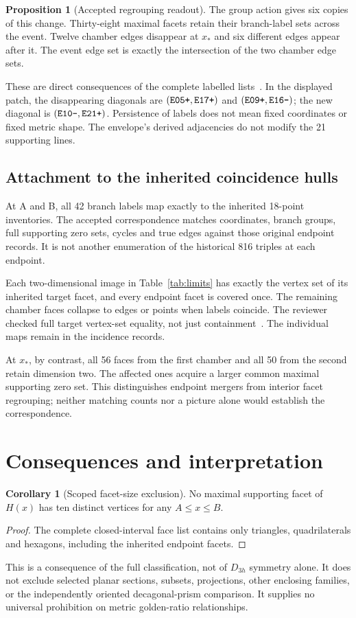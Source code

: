 \documentclass[11pt,a4paper]{article}
\newcommand{\xs}{x_*}
\newcommand{\br}[1]{\textnormal{\texttt{#1}}}
\theoremstyle{definition}
\newtheorem{proposition}[theorem]{Proposition}
\newtheorem{corollary}[theorem]{Corollary}
\begin{document}
\begin{proposition}[Accepted regrouping readout]\label{prop:regroup}
The group action gives six copies of this change. Thirty-eight maximal facets retain their branch-label sets across the event. Twelve chamber edges disappear at $\xs$ and six different edges appear after it. The event edge set is exactly the intersection of the two chamber edge sets.
\end{proposition}
These are direct consequences of the complete labelled lists~\cite{investigation,review}. In the displayed patch, the disappearing diagonals are $(\br{E05+},\br{E17+})$ and $(\br{E09+},\br{E16-})$; the new diagonal is $(\br{E10-},\br{E21+})$. Persistence of labels does not mean fixed coordinates or fixed metric shape. The envelope's derived adjacencies do not modify the 21 supporting lines.

\subsection{Attachment to the inherited coincidence hulls}\label{sec:endpoints}
At A and B, all 42 branch labels map exactly to the inherited 18-point inventories. The accepted correspondence matches coordinates, branch groups, full supporting zero sets, cycles and true edges against those original endpoint records. It is not another enumeration of the historical 816 triples at each endpoint.

Each two-dimensional image in Table~\ref{tab:limits} has exactly the vertex set of its inherited target facet, and every endpoint facet is covered once. The remaining chamber faces collapse to edges or points when labels coincide. The reviewer checked full target vertex-set equality, not just containment~\cite[Section 3.5]{review}. The individual maps remain in the incidence records.

At $\xs$, by contrast, all 56 faces from the first chamber and all 50 from the second retain dimension two. The affected ones acquire a larger common maximal supporting zero set. This distinguishes endpoint mergers from interior facet regrouping; neither matching counts nor a picture alone would establish the correspondence.

\clearpage
\section{Consequences and interpretation}\label{sec:scope}
\begin{corollary}[Scoped facet-size exclusion]\label{cor:ten}
No maximal supporting facet of $H(x)$ has ten distinct vertices for any $A\le x\le B$.
\end{corollary}
\begin{proof}
The complete closed-interval face list contains only triangles, quadrilaterals and hexagons, including the inherited endpoint facets.\end{proof}
This is a consequence of the full classification, not of $D_{3h}$ symmetry alone. It does not exclude selected planar sections, subsets, projections, other enclosing families, or the independently oriented decagonal-prism comparison. It supplies no universal prohibition on metric golden-ratio relationships.
\end{document}
